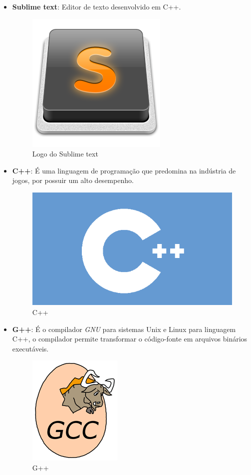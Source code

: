 \documentclass[11pt]{article} %
\begin{document}
\begin{itemize}
\item \textbf{Sublime text}: Editor de texto desenvolvido em C++.

\begin{figure}[!htp]
\centering
\includegraphics[scale=0.3]{pictures/Sublime_Text_Logo.png}
\caption{Logo do Sublime text}
\label{Sublime text}
\end{figure}

\newpage

\item \textbf{C++}: É uma linguagem de programação que predomina na indústria de jogos, por possuir um alto desempenho.

\begin{figure}[!htp]
\centering
\includegraphics[scale=0.2]{pictures/cpp.png}
\caption{C++}
\label{C++}
\end{figure}

\item \textbf{G++}: É o compilador \textit{GNU} para sistemas Unix e Linux para linguagem C++, o compilador permite transformar o código-fonte em arquivos binários executáveis.

\begin{figure}[!htp]
\centering
\includegraphics[scale=0.4]{pictures/GCC.png}
\caption{G++}
\label{Logo do G++}
\end{figure}


\end{itemize}
\end{document}
